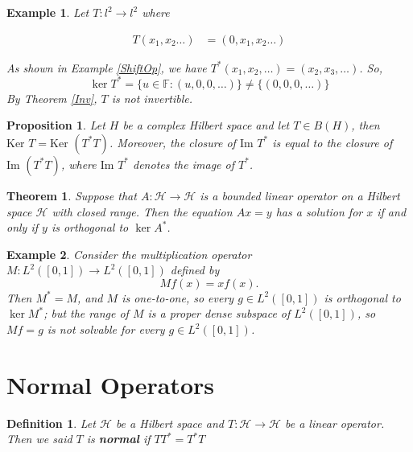 \documentclass{report}
\newtheorem{thm}{Theorem}
\newtheorem{defn}{Definition}
\newtheorem{exm}{Example}
\newtheorem{prop}{Proposition}
\begin{document}
\begin{exm} \label{ShiftOpInv}
Let $T: l^{2} \rightarrow l^{2}$ where 

$$\begin{aligned} T\left(x_{1}, x_{2} \ldots\right) & =\left(0, x_{1}, x_{2} \ldots\right)   \end{aligned}$$

As shown in Example \ref{ShiftOp}, we have $T^{*}(x_{1},x_{2},\dots) = (x_{2},x_{3},\dots)$. So, $$\operatorname{ker}T^{*} = \{u\in\mathbb{F}: (u,0,0,\dots)\}\not=\{(0,0,0,\dots)\}$$ By Theorem \ref{Inv}, $T$ is not invertible.
\end{exm}

\begin{prop}
Let $H$ be a complex Hilbert space and let $T \in B(H)$, then $\text{Ker } T = \text{Ker } (T^*T)$.
Moreover, the closure of $\text{Im } T^*$ is equal to the closure of $\text{Im } (T^*T)$, where $\text{Im } T^*$ denotes the image of $T^*$.
\end{prop}


\begin{thm}
Suppose that $A:\mathcal{H}\rightarrow\mathcal{H}$ is a bounded linear operator on a Hilbert space $\mathcal{H}$ with closed range. Then the equation $Ax=y$ has a solution for $x$ if and only if $y$ is orthogonal to $\ker A^{*}$.
\end{thm}

\begin{exm}
Consider the multiplication operator $M:L^{2}([0,1])\rightarrow L^{2}([0,1])$ defined by
$$
Mf(x)=xf(x).
$$
Then $M^{*}=M$, and $M$ is one-to-one, so every $g\in L^{2}([0,1])$ is orthogonal to $\ker M^{*}$; but the range of $M$ is a proper dense subspace of $L^{2}([0,1])$, so $Mf=g$ is not solvable for every $g\in L^{2}([0,1])$.
\end{exm}

\section{Normal Operators}

\begin{defn} %
  Let $\mathcal{H}$ be a Hilbert space and $T: \mathcal{H} \rightarrow \mathcal{H}$ be a linear operator. Then we said $T$ is \textbf{normal} if $TT^{*}=T^{*}T$
\end{defn} 
\end{document}
